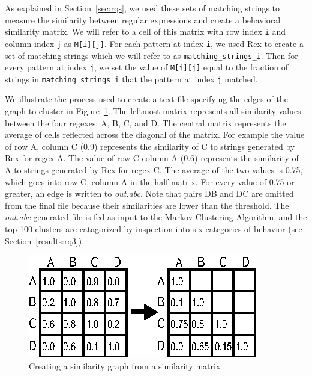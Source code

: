 As explained in Section~\ref{sec:rqs}, we used these sets of matching strings to  measure the similarity between regular expressions and create a behavioral similarity matrix.  We will refer to a cell of this matrix with row index {\tt i} and column index {\tt j} as {\tt M[i][j]}.  For each pattern at index {\tt i}, we used Rex to create a set of matching strings which we will refer to as {\tt matching\_strings\_i}.  Then for every pattern at index {\tt j}, we set the value of {\tt M[i][j]} equal to the fraction of strings in {\tt matching\_strings\_i} that the pattern at index {\tt j} matched.

We illustrate the process used to create a text file specifying the edges of the graph to cluster in Figure~\ref{fig:matrixToGraph}.
The leftmost matrix represents all similarity values between the four regexes: A, B, C, and D.  The central matrix represents the average of cells reflected across the diagonal of the matrix.  For example the value of row A, column C (0.9) represents the similarity of C to strings generated by Rex for regex A.  The value of row C column A (0.6) represents the similarity of A to strings generated by Rex for regex C.  The average of the two values is 0.75, which goes into row C, column A in the half-matrix.  For every value of 0.75 or greater, an edge is written to \emph{out.abc}.
Note that pairs DB and DC are omitted from the final file because their similarities are lower than the threshold.  The \emph{out.abc} generated file  is fed as input to the Markov Clustering Algorithm, and the top 100 clusters are catagorized by inspection into six categories of behavior (see Section~\ref{results:rq3}).


\begin{figure}[tb]
\centering
\includegraphics[width=\columnwidth]{../illustrations/matrixToGraph.eps}
\caption{Creating a similarity graph from a similarity matrix}
\label{fig:matrixToGraph}
\end{figure}



